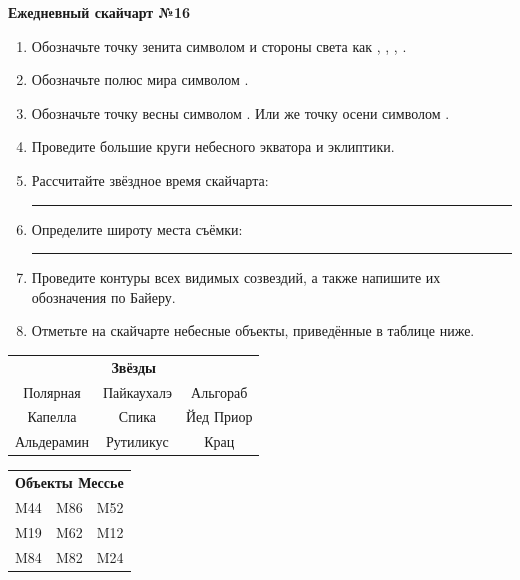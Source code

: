 \documentclass{./SAS-class-skygen}
\begin{document}
    
    
    
	\begin{center}
		\large\textbf{Ежедневный скайчарт №16}
	\end{center}

	\begin{enumerate}
		\item Обозначьте точку зенита символом  и стороны света как , , , .
		\item Обозначьте полюс мира символом .
		\item Обозначьте точку весны символом \Aries. Или же точку осени символом \Libra.
		\item Проведите большие круги небесного экватора и эклиптики.
		\item Рассчитайте звёздное время скайчарта: \rule{2cm}{0.4pt}
		\item Определите широту места съёмки: \rule{2cm}{0.4pt}
		\item Проведите контуры всех видимых созвездий, а также напишите их обозначения по Байеру.
		\item Отметьте на скайчарте небесные объекты, приведённые в таблице ниже.
	\end{enumerate}
	
    \vspace{0.5cm}

    \begin{table}[h!]
    \centering
    \begin{tabular}{ccc}
    \multicolumn{3}{c}{\textbf{Звёзды}} \\ Полярная & Пайкаухалэ & Альгораб \\
Капелла & Спика & Йед Приор \\
Альдерамин & Рутиликус & Крац \\

\end{tabular}
    \hfill
    \begin{tabular}{ccc}
    \multicolumn{3}{c}{\textbf{Объекты Мессье}} \\ M44 & M86 & M52 \\
M19 & M62 & M12 \\
M84 & M82 & M24 \\

\end{tabular}
    \end{table}
	
\end{document}
